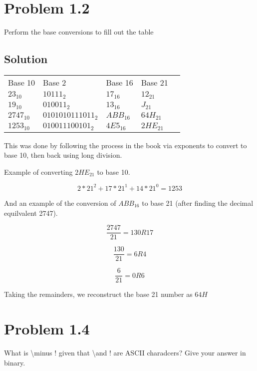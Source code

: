 \documentclass[letterpaper,11pt]{texMemo} %
\begin{document}
\maketitle %


\section*{Problem 1.2}
Perform the base conversions to fill out the table
\subsection*{Solution}

\begin{table}[ht]
    \begin{tabular}{lllll}
    Base 10        & Base 2             & Base 16       & Base 21 &  \\
    $23_{10}$      & $10111_2$          & $17_{16}$     & $12_{21}$      &  \\
    $19_{10}$      & $010011_2$         & $13_{16}$     & $J_{21}$       &  \\
    $2747_{10}$    & $0101010111011_2$  & $ABB_{16}$    & $64H_{21}$     &  \\
    $1253_{10}$    & $010011100101_2$   & $4E5_{16}$    & $2HE_{21}$     & 
    \end{tabular}
\end{table}

This was done by following the process in the book via exponents to convert to base 10, then back using
long division.

Example of converting $2HE_{21}$ to base 10.

\[
    2*21^2+17*21^1+14*21^0 = 1253
\]

And an example of the conversion of $ABB_{16}$ to base 21 (after finding the decimal equilvalent 2747).

\[
    \frac{2747}{21} = 130 R 17
\]

\[
    \frac{130}{21} = 6 R 4
\]

\[
    \frac{6}{21} = 0 R 6
\]

Taking the remainders, we reconstruct the base 21 number as $64H$

\newpage
\section*{Problem 1.4}
What is \textbackslash minus ! given that \textbackslash and ! are ASCII charadcers? Give your answer in binary.
\end{document}
